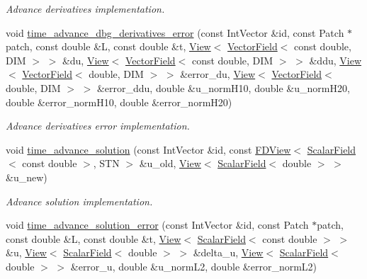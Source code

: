 \begin{DoxyCompactItemize}
\begin{DoxyCompactList}\small\item\em Advance derivatives implementation. \end{DoxyCompactList}\item 
void \hyperlink{classUintah_1_1PhaseField_1_1Heat_a0ac23c69e2e55fd9413f259469a347e4}{time\+\_\+advance\+\_\+dbg\+\_\+derivatives\+\_\+error} (const Int\+Vector \&id, const Patch $\ast$patch, const double \&L, const double \&t, \hyperlink{namespaceUintah_1_1PhaseField_a59210a1e28eba254d428762c92ddeabb}{View}$<$ \hyperlink{structUintah_1_1PhaseField_1_1VectorField}{Vector\+Field}$<$ const double, D\+IM $>$ $>$ \&du, \hyperlink{namespaceUintah_1_1PhaseField_a59210a1e28eba254d428762c92ddeabb}{View}$<$ \hyperlink{structUintah_1_1PhaseField_1_1VectorField}{Vector\+Field}$<$ const double, D\+IM $>$ $>$ \&ddu, \hyperlink{namespaceUintah_1_1PhaseField_a59210a1e28eba254d428762c92ddeabb}{View}$<$ \hyperlink{structUintah_1_1PhaseField_1_1VectorField}{Vector\+Field}$<$ double, D\+IM $>$ $>$ \&error\+\_\+du, \hyperlink{namespaceUintah_1_1PhaseField_a59210a1e28eba254d428762c92ddeabb}{View}$<$ \hyperlink{structUintah_1_1PhaseField_1_1VectorField}{Vector\+Field}$<$ double, D\+IM $>$ $>$ \&error\+\_\+ddu, double \&u\+\_\+norm\+H10, double \&u\+\_\+norm\+H20, double \&error\+\_\+norm\+H10, double \&error\+\_\+norm\+H20)
\begin{DoxyCompactList}\small\item\em Advance derivatives error implementation. \end{DoxyCompactList}\item 
void \hyperlink{classUintah_1_1PhaseField_1_1Heat_aa3871d06b39cf5b7e2b8a0db0aaf61fb}{time\+\_\+advance\+\_\+solution} (const Int\+Vector \&id, const \hyperlink{namespaceUintah_1_1PhaseField_a63032464b1cd54eaa53c1c29109746ac}{F\+D\+View}$<$ \hyperlink{structUintah_1_1PhaseField_1_1ScalarField}{Scalar\+Field}$<$ const double $>$, S\+TN $>$ \&u\+\_\+old, \hyperlink{namespaceUintah_1_1PhaseField_a59210a1e28eba254d428762c92ddeabb}{View}$<$ \hyperlink{structUintah_1_1PhaseField_1_1ScalarField}{Scalar\+Field}$<$ double $>$ $>$ \&u\+\_\+new)
\begin{DoxyCompactList}\small\item\em Advance solution implementation. \end{DoxyCompactList}\item 
void \hyperlink{classUintah_1_1PhaseField_1_1Heat_ad355ac710c7d6e1d646699b4a7ab1270}{time\+\_\+advance\+\_\+solution\+\_\+error} (const Int\+Vector \&id, const Patch $\ast$patch, const double \&L, const double \&t, \hyperlink{namespaceUintah_1_1PhaseField_a59210a1e28eba254d428762c92ddeabb}{View}$<$ \hyperlink{structUintah_1_1PhaseField_1_1ScalarField}{Scalar\+Field}$<$ const double $>$ $>$ \&u, \hyperlink{namespaceUintah_1_1PhaseField_a59210a1e28eba254d428762c92ddeabb}{View}$<$ \hyperlink{structUintah_1_1PhaseField_1_1ScalarField}{Scalar\+Field}$<$ double $>$ $>$ \&delta\+\_\+u, \hyperlink{namespaceUintah_1_1PhaseField_a59210a1e28eba254d428762c92ddeabb}{View}$<$ \hyperlink{structUintah_1_1PhaseField_1_1ScalarField}{Scalar\+Field}$<$ double $>$ $>$ \&error\+\_\+u, double \&u\+\_\+norm\+L2, double \&error\+\_\+norm\+L2)

\end{DoxyCompactItemize}
